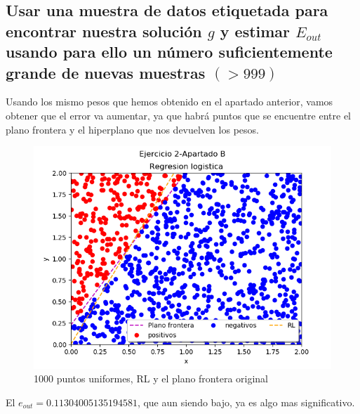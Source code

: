 \documentclass[12pt,a4paper]{article}
\begin{document}
\subsection{Usar una muestra de datos etiquetada para encontrar  nuestra solución $g$ y estimar $E_{out}$ usando para ello un número suficientemente grande de nuevas muestras $(>999)$}
Usando los mismo pesos que hemos obtenido en el apartado anterior, vamos obtener que el error va aumentar, ya que habrá puntos que se encuentre entre el plano frontera y el hiperplano que nos devuelven los pesos. 
\begin{figure}[H]  %
	\centering
	\includegraphics{images/ejercicio2ApartadoB.png}  
	\caption{1000 puntos uniformes, RL y el plano frontera original}
	\label{figura10}
\end{figure}
El $e_{out} = 0.11304005135194581$, que aun siendo bajo, ya es algo mas significativo.
\end{document}
